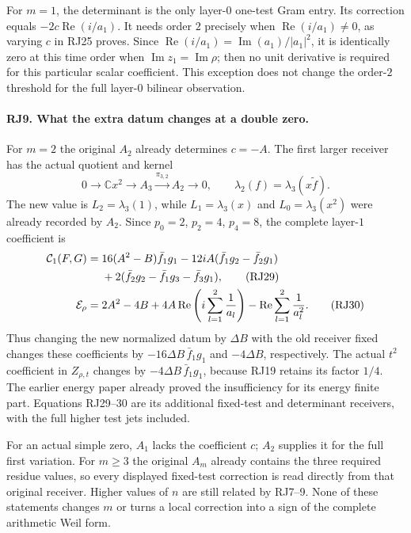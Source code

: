 For $m=1$, the determinant is the only layer-$0$ one-test Gram
entry. Its correction equals
$-2c\operatorname{Re}(i/a_1)$. It needs order $2$ precisely
when $\operatorname{Re}(i/a_1)\ne0$, as varying $c$ in RJ25
proves. Since $\operatorname{Re}(i/a_1)=
\operatorname{Im}(a_1)/|a_1|^2$, it is identically zero at this
time order when $\operatorname{Im}z_1=\operatorname{Im}\rho$;
then no unit derivative is required for this particular scalar
coefficient. This exception does not change the order-$2$
threshold for the full layer-$0$ bilinear observation.

\paragraph{RJ9. What the extra datum changes at a double zero.}
For $m=2$ the original $A_2$ already determines $c=-A$.
The first larger receiver has the actual quotient and kernel
\[
 0\longrightarrow\mathbb Cx^2\longrightarrow A_3
        \xrightarrow{\pi_{3,2}}A_2\longrightarrow0,
 \qquad\lambda_2(f)=\lambda_3(x\widetilde f).
 \tag{RJ28}
\]
The new value is $L_2=\lambda_3(1)$, while
$L_1=\lambda_3(x)$ and $L_0=\lambda_3(x^2)$ were already
recorded by $A_2$. Since $p_0=2$, $p_2=4$, $p_4=8$,
the complete layer-$1$ coefficient is
\begin{align}
 \mathcal C_1(F,G)={}&16(A^2-B)\bar f_1g_1
       -12iA(\bar f_1g_2-\bar f_2g_1)\notag\\
 &+2(\bar f_2g_2-\bar f_1g_3-\bar f_3g_1),
 \tag{RJ29}\\
 \mathcal E_\rho={}&2A^2-4B
       +4A\operatorname{Re}\left(i\sum_{l=1}^2\frac1{a_l}\right)
       -\operatorname{Re}\sum_{l=1}^2\frac1{a_l^2}.
 \tag{RJ30}
\end{align}
Thus changing the new normalized datum by $\Delta B$ with the
old receiver fixed changes these coefficients by
$-16\Delta B\,\bar f_1g_1$ and $-4\Delta B$, respectively.
The actual $t^2$ coefficient in $Z_{\rho,t}$ changes by
$-4\Delta B\,\bar f_1g_1$, because RJ19 retains its factor
$1/4$. The earlier energy paper already proved the insufficiency
for its energy finite part. Equations RJ29--30 are its additional
fixed-test and determinant receivers, with the full higher test
jets included.

For an actual simple zero, $A_1$ lacks the coefficient $c$;
$A_2$ supplies it for the full first variation. For $m\ge3$ the
original $A_m$ already contains the three required residue values,
so every displayed fixed-test correction is read directly from
that original receiver. Higher values of $n$ are still related by
RJ7--9. None of these statements changes $m$ or turns a local
correction into a sign of the complete arithmetic Weil form.


